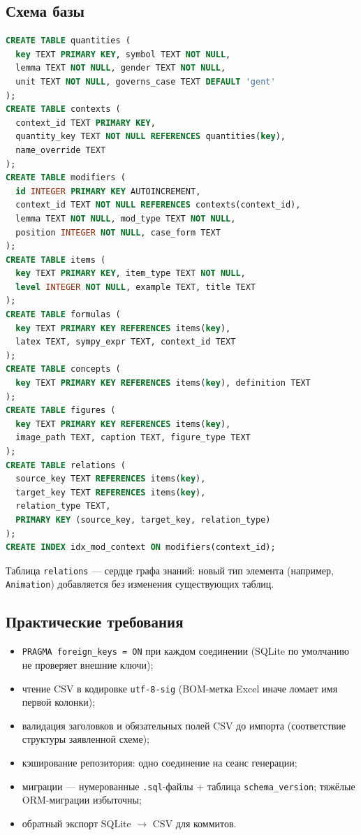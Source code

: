 \documentclass[12pt,a4paper]{article}
\begin{document}
\subsection{Схема базы}
\begin{lstlisting}[language=SQL,caption={Основные таблицы (сокращённо)}]
CREATE TABLE quantities (
  key TEXT PRIMARY KEY, symbol TEXT NOT NULL,
  lemma TEXT NOT NULL, gender TEXT NOT NULL,
  unit TEXT NOT NULL, governs_case TEXT DEFAULT 'gent'
);
CREATE TABLE contexts (
  context_id TEXT PRIMARY KEY,
  quantity_key TEXT NOT NULL REFERENCES quantities(key),
  name_override TEXT
);
CREATE TABLE modifiers (
  id INTEGER PRIMARY KEY AUTOINCREMENT,
  context_id TEXT NOT NULL REFERENCES contexts(context_id),
  lemma TEXT NOT NULL, mod_type TEXT NOT NULL,
  position INTEGER NOT NULL, case_form TEXT
);
CREATE TABLE items (
  key TEXT PRIMARY KEY, item_type TEXT NOT NULL,
  level INTEGER NOT NULL, example TEXT, title TEXT
);
CREATE TABLE formulas (
  key TEXT PRIMARY KEY REFERENCES items(key),
  latex TEXT, sympy_expr TEXT, context_id TEXT
);
CREATE TABLE concepts (
  key TEXT PRIMARY KEY REFERENCES items(key), definition TEXT
);
CREATE TABLE figures (
  key TEXT PRIMARY KEY REFERENCES items(key),
  image_path TEXT, caption TEXT, figure_type TEXT
);
CREATE TABLE relations (
  source_key TEXT REFERENCES items(key),
  target_key TEXT REFERENCES items(key),
  relation_type TEXT,
  PRIMARY KEY (source_key, target_key, relation_type)
);
CREATE INDEX idx_mod_context ON modifiers(context_id);
\end{lstlisting}

Таблица \texttt{relations} --- сердце графа знаний: новый тип элемента (например, \texttt{Animation}) добавляется без изменения существующих таблиц.

\subsection{Практические требования}
\begin{itemize}
  \item \texttt{PRAGMA foreign\_keys = ON} при каждом соединении (SQLite по умолчанию не проверяет внешние ключи);
  \item чтение CSV в кодировке \texttt{utf-8-sig} (BOM-метка Excel иначе ломает имя первой колонки);
  \item валидация заголовков и обязательных полей CSV до импорта (соответствие структуры заявленной схеме);
  \item кэширование репозитория: одно соединение на сеанс генерации;
  \item миграции --- нумерованные \texttt{.sql}-файлы + таблица \texttt{schema\_version}; тяжёлые ORM-миграции избыточны;
  \item обратный экспорт SQLite $\to$ CSV для коммитов.
\end{itemize}
\end{document}
